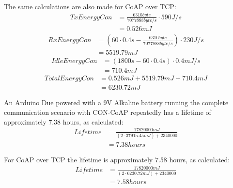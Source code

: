 The same calculations are also made for CoAP over TCP:
\begin{equation}\label{eq:txtcp}
\begin{aligned}
TxEnergyCon &= \frac{6310 byte}{7077888 byte/s } \cdot 590 J/s
 \\&= 0.526 mJ   
\end{aligned}
\end{equation}
\begin{equation}\label{eq:rxtcp}
\begin{aligned}
RxEnergyCon &= (60 \cdot 0.4 s - \frac{6310 byte}{7077888 byte/s }) \cdot 230 J/s 
\\&= 5519.79 mJ
\end{aligned}   
\end{equation}
\begin{equation}\label{eq:idletcp}
\begin{aligned}
IdleEnergyCon &= (1800 s - 60 \cdot 0.4 s) \cdot 0.4 mJ/s 
\\&= 710.4 mJ %
\end{aligned}  
\end{equation}
\begin{equation}\label{eq:totaltcp}
\begin{aligned}
TotalEnergyCon &= 0.526 mJ + 5519.79 mJ + 710.4 mJ 
\\&= 6230.72 mJ 
\end{aligned}
\end{equation}

An Arduino Due powered with a 9V Alkaline battery running the complete communication scenario with CON-CoAP repeatedly has a lifetime of approximately 7.38 hours, as calculated: 
\begin{equation}\label{eq:concoaphours}
\begin{aligned}
Lifetime &= \frac{17820000 mJ }{(2 \cdot 37915.45 mJ)+2340000} 
\\&=7.38 hours %
\end{aligned}
\end{equation}

For CoAP over TCP the lifetime is approximately 7.58 hours, as calculated:
\begin{equation}\label{eq:years}
\begin{aligned}
Lifetime &= \frac{17820000 mJ }{(2 \cdot 6230.72 mJ)+2340000 } 
\\&= 7.58 hours %
\end{aligned} 
\end{equation}


